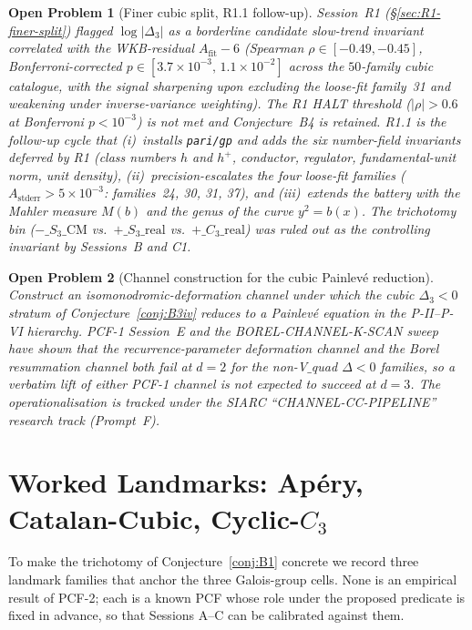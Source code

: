 \documentclass[11pt,a4paper]{article}
\newtheorem{problem}{Open Problem}
\theoremstyle{definition}
\theoremstyle{remark}
\begin{document}
\begin{problem}[Finer cubic split, R1.1
follow-up]\label{op:finer-cubic-split}
Session~R1 (\S\ref{sec:R1-finer-split}) flagged $\log|\Delta_{3}|$ as
a borderline candidate slow-trend invariant correlated with the
WKB-residual $A_{\mathrm{fit}}-6$ (Spearman $\rho\in[-0.49,-0.45]$,
Bonferroni-corrected $p\in[3.7\times 10^{-3},\,1.1\times 10^{-2}]$
across the $50$-family cubic catalogue, with the signal sharpening
upon excluding the loose-fit family~31 and weakening under inverse-variance
weighting). The R1 HALT threshold ($|\rho|>0.6$ at Bonferroni
$p<10^{-3}$) is not met and Conjecture~B4 is retained. R1.1 is the
follow-up cycle that (i)~installs \texttt{pari/gp} and adds the six
number-field invariants deferred by R1 (class numbers $h$ and $h^{+}$,
conductor, regulator, fundamental-unit norm, unit density),
(ii)~precision-escalates the four loose-fit families
($A_{\mathrm{stderr}}>5\times 10^{-3}$: families~24, 30, 31, 37), and
(iii)~extends the battery with the Mahler measure $M(b)$ and the
genus of the curve $y^{2}=b(x)$. The trichotomy bin
($-\_S_{3}\_\mathrm{CM}$ vs.\ $+\_S_{3}\_\mathrm{real}$ vs.\
$+\_C_{3}\_\mathrm{real}$) was ruled out as the controlling invariant
by Sessions~B and C1.
\end{problem}

\begin{problem}[Channel construction for the cubic Painlev\'e
reduction]\label{op:cc-pipeline}
Construct an isomonodromic-deformation channel under which the cubic
$\Delta_{3}<0$ stratum of Conjecture~\ref{conj:B3iv} reduces to a
Painlev\'e equation in the P-II--P-VI hierarchy. PCF-1 Session~E and
the BOREL-CHANNEL-K-SCAN sweep~\cite{Papanokechi2026PCF1} have shown
that the recurrence-parameter deformation channel and the Borel
resummation channel both fail at $d=2$ for the
non-V$\_$quad $\Delta<0$ families, so a verbatim lift of either
PCF-1 channel is not expected to succeed at $d=3$. The
operationalisation is tracked under the SIARC ``CHANNEL-CC-PIPELINE''
research track (Prompt~F).
\end{problem}

\section{Worked Landmarks: Ap\'ery, Catalan-Cubic, Cyclic-$C_{3}$}\label{sec:landmarks}

To make the trichotomy of Conjecture~\ref{conj:B1} concrete we record
three landmark families that anchor the three Galois-group cells. None
is an empirical result of PCF-2; each is a known PCF whose role under
the proposed predicate is fixed in advance, so that Sessions A--C can be
calibrated against them.
\end{document}
